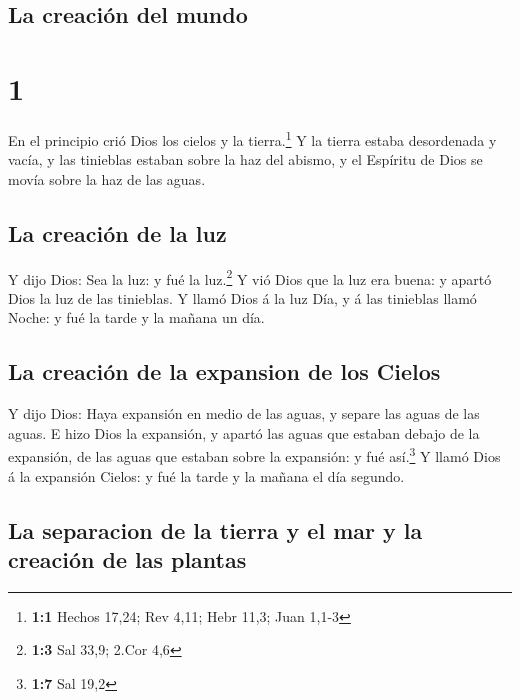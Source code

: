 \hypertarget{la-creaciuxf3n-del-mundo}{%
\subsection{La creación del mundo}\label{la-creaciuxf3n-del-mundo}}

\hypertarget{section}{%
\section{1}\label{section}}

 En el principio crió Dios los cielos y la
tierra.\footnote{\textbf{1:1} Hechos 17,24; Rev 4,11; Hebr 11,3; Juan
  1,1-3}  Y la tierra estaba desordenada y vacía, y las
tinieblas estaban sobre la haz del abismo, y el Espíritu de Dios se
movía sobre la haz de las aguas.

\hypertarget{la-creaciuxf3n-de-la-luz}{%
\subsection{La creación de la luz}\label{la-creaciuxf3n-de-la-luz}}

 Y dijo Dios: Sea la luz: y fué la luz.\footnote{\textbf{1:3}
  Sal 33,9; 2.Cor 4,6}  Y vió Dios que la luz era buena: y
apartó Dios la luz de las tinieblas.  Y llamó Dios á la luz
Día, y á las tinieblas llamó Noche: y fué la tarde y la mañana un día.

\hypertarget{la-creaciuxf3n-de-la-expansion-de-los-cielos}{%
\subsection{La creación de la expansion de los
Cielos}\label{la-creaciuxf3n-de-la-expansion-de-los-cielos}}

 Y dijo Dios: Haya expansión en medio de las aguas, y separe
las aguas de las aguas.  E hizo Dios la expansión, y apartó
las aguas que estaban debajo de la expansión, de las aguas que estaban
sobre la expansión: y fué así.\footnote{\textbf{1:7} Sal 19,2}
 Y llamó Dios á la expansión Cielos: y fué la tarde y la
mañana el día segundo.

\hypertarget{la-separacion-de-la-tierra-y-el-mar-y-la-creaciuxf3n-de-las-plantas}{%
\subsection{La separacion de la tierra y el mar y la creación de las
plantas}\label{la-separacion-de-la-tierra-y-el-mar-y-la-creaciuxf3n-de-las-plantas}}

